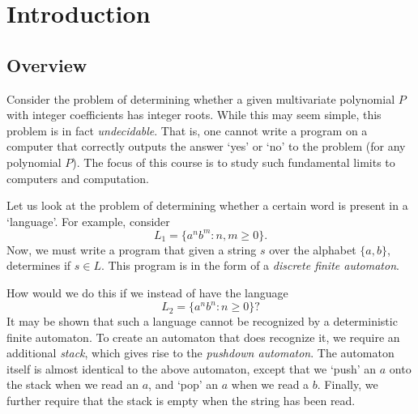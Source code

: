 \section{Introduction}

\subsection{Overview}

Consider the problem of determining whether a given multivariate polynomial $P$ with integer coefficients has integer roots. While this may seem simple, this problem is in fact \emph{undecidable}. That is, one cannot write a program on a computer that correctly outputs the answer `yes' or `no' to the problem (for any polynomial $P$). The focus of this course is to study such fundamental limits to computers and computation.

Let us look at the problem of determining whether a certain word is present in a `language'. For example, consider
\[ L_1 = \{ a^n b^m : n,m\ge 0 \}. \]
Now, we must write a program that given a string $s$ over the alphabet $\{a,b\}$, determines if $s \in L$. This program is in the form of a \emph{discrete finite automaton}.

\begin{center}
\end{center}

How would we do this if we instead of have the language
\[ L_2 = \{ a^n b^n : n \ge 0 \}? \]
It may be shown that such a language cannot be recognized by a deterministic finite automaton. To create an automaton that does recognize it, we require an additional \emph{stack}, which gives rise to the \emph{pushdown automaton}. The automaton itself is almost identical to the above automaton, except that we `push' an $a$ onto the stack when we read an $a$, and `pop' an $a$ when we read a $b$. Finally, we further require that the stack is empty when the string has been read.\\

